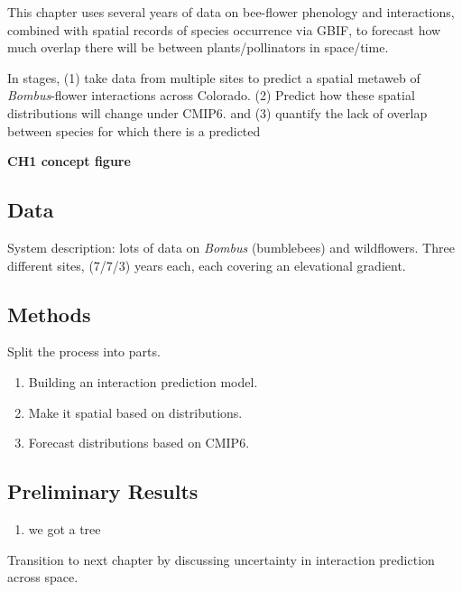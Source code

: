 \documentclass[10pt,oneside]{article}
\begin{document}
This chapter uses several years of data on bee-flower phenology and
interactions, combined with spatial records of species occurrence via
GBIF, to forecast how much overlap there will be between
plants/pollinators in space/time.

In stages, (1) take data from multiple sites to predict a spatial
metaweb of \emph{Bombus}-flower interactions across Colorado. (2)
Predict how these spatial distributions will change under CMIP6. and (3)
quantify the lack of overlap between species for which there is a
predicted

\textbf{CH1 concept figure}

\hypertarget{data}{%
\subsection{Data}\label{data}}

System description: lots of data on \emph{Bombus} (bumblebees) and
wildflowers. Three different sites, (7/7/3) years each, each covering an
elevational gradient.

\hypertarget{methods}{%
\subsection{Methods}\label{methods}}

Split the process into parts.

\begin{enumerate}
\def\labelenumi{\arabic{enumi})}
\tightlist
\item
  Building an interaction prediction model.
\item
  Make it spatial based on distributions.
\item
  Forecast distributions based on CMIP6.
\end{enumerate}

\hypertarget{preliminary-results}{%
\subsection{Preliminary Results}\label{preliminary-results}}

\begin{enumerate}
\def\labelenumi{\arabic{enumi})}
\tightlist
\item
  we got a tree
\end{enumerate}

Transition to next chapter by discussing uncertainty in interaction
prediction across space.
\end{document}
